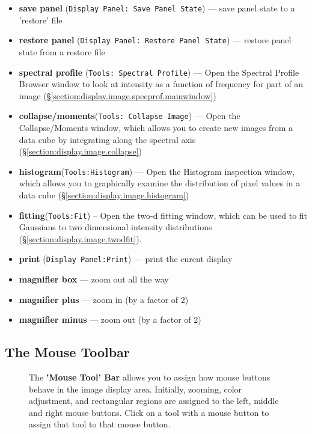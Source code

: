 \begin{itemize}
   \item  {\bf save panel} ({\tt Display Panel: Save Panel State}) --- save panel state to a 'restore' file
   \item  {\bf restore panel} ({\tt Display Panel: Restore Panel State}) --- restore panel state from a restore file
   \item  {\bf spectral profile} ({\tt Tools: Spectral Profile}) --- Open the Spectral Profile Browser window to look at intensity as a function of frequency for part of an image (\S \ref{section:display.image.specprof.mainwindow})
   \item  {\bf collapse/moments}({\tt Tools: Collapse Image}) --- Open the Collapse/Moments window, which allows you to create new images from a data cube by integrating along the spectral axis (\S \ref{section:display.image.collapse})
   \item  {\bf histogram}({\tt Tools:Histogram}) --- Open the Histogram inspection window, which allows you to graphically examine the distribution of pixel values in a data cube (\S \ref{section:display.image.histogram})
   \item  {\bf fitting}({\tt Tools:Fit}) -- Open the two-d fitting window, which can be used to fit Gaussians to two dimensional intensity distributions (\S \ref{section:display.image.twodfit}).
   \item {\bf print} ({\tt Display Panel:Print}) --- print the curent display
   \item {\bf magnifier box} --- zoom out all the way
   \item {\bf magnifier plus} --- zoom in (by a factor of 2)
   \item {\bf magnifier minus} --- zoom out (by a factor of 2)
\end{itemize}

\subsection{The Mouse Toolbar}
\label{section:display.viewerGUI.displaypanel.mousetoolbar}

\begin{figure}[h!]
\begin{center}
\caption{\label{fig:viewer_mousetoolbar} The 
{\bf 'Mouse Tool' Bar} allows you to assign how mouse buttons behave in 
the image display area.  Initially, zooming, color adjustment, and rectangular 
regions are assigned to the left, middle and right mouse buttons. Click on a tool
with a mouse button to assign that tool to that mouse button.}
\hrulefill
\end{center}
\end{figure}

